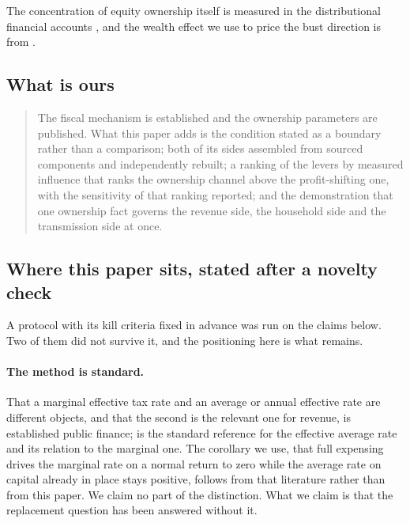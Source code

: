 The concentration of equity ownership itself is measured in the distributional financial accounts
\citep{FRBDFA}, and the wealth effect we use to price the bust direction is from
\citet{ChodorowReichNenovSimsek2021}.

\subsection{What is ours}

\begin{quote}
The fiscal mechanism is established and the ownership parameters are published. What this paper
adds is the condition stated as a boundary rather than a comparison; both of its sides assembled
from sourced components and independently rebuilt; a ranking of the levers by measured influence
that ranks the ownership channel above the profit-shifting one, with the sensitivity of that
ranking reported; and the demonstration that one ownership fact
governs the revenue side, the household side and the transmission side at once.
\end{quote}

\subsection{Where this paper sits, stated after a novelty check}
\label{sec:position}

A protocol with its kill criteria fixed in advance was run on the claims below. Two of them did
not survive it, and the positioning here is what remains.

\paragraph{The method is standard.} That a marginal effective tax rate and an average or annual
effective rate are different objects, and that the second is the relevant one for revenue, is
established public finance; \citet{DevereuxGriffith2003} is the standard reference for the
effective average rate and its relation to the marginal one. The corollary we use, that full
expensing drives the marginal rate on a normal return to zero while the average rate on capital
already in place stays positive, follows from that literature rather than from this paper. We
claim no part of the distinction. What we claim is that the replacement question has been
answered without it.

